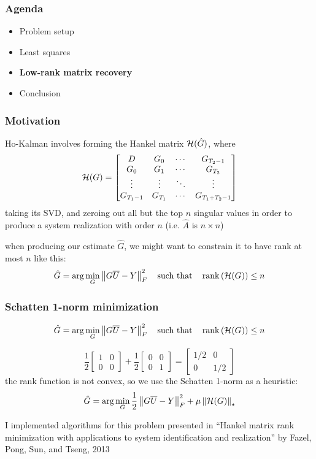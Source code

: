 \begin{frame}
\frametitle{Agenda}
\begin{itemize}
\item Problem setup
\item Least squares
\item \textbf{Low-rank matrix recovery}
\item Conclusion
\end{itemize}
\end{frame}

\begin{frame}
\frametitle{Motivation}
Ho-Kalman involves forming the Hankel matrix $\mathcal{H}(\hat G)$, where
\[
  \mathcal{H}(G) = \begin{bmatrix}
    D & G_0 & \cdots & G_{T_2-1} \\
    G_0 & G_1 & \cdots & G_{T_2} \\
    \vdots & \vdots & \ddots & \vdots \\
    G_{T_1-1} & G_{T_1} & \cdots & G_{T_1 + T_2 - 1}
  \end{bmatrix}
\]
taking its SVD, and zeroing out all but the top $n$ singular values
in order to produce a system realization with order $n$
(i.e. $\hat A$ is $n \times n$)

when producing our estimate $\hat G$,
we might want to constrain it to have rank at most $n$ like this:
\[
\hat G = \arg\min_G \left\Vert{G \overline{U} - Y}\right\Vert_F^2 \quad
\text{such that} \quad \operatorname{rank}\left({\mathcal{H}(G)}\right) \le n
\]
\end{frame}

\begin{frame}
\frametitle{Schatten 1-norm minimization}
\[
\hat G = \arg\min_G \left\Vert{G \overline{U} - Y}\right\Vert_F^2 \quad
\text{such that} \quad \operatorname{rank}\left({\mathcal{H}(G)}\right) \le n
\]

\[
\frac{1}{2} \begin{bmatrix} 1 & 0 \\ 0 & 0 \end{bmatrix}
+ \frac{1}{2} \begin{bmatrix} 0 & 0 \\ 0 & 1 \end{bmatrix}
= \begin{bmatrix} 1/2 & 0 \\ 0 & 1/2 \end{bmatrix}
\]
the rank function is not convex, so we use the Schatten 1-norm as a heuristic:
\[
\hat G = \arg\min_G \frac{1}{2} \left\Vert{G \overline{U} - Y}\right\Vert_F^2 + \mu \left\Vert{\mathcal{H}(G)}\right\Vert_\star
\]

I implemented algorithms for this problem presented in
``Hankel matrix rank minimization
with applications to system identification and realization''
by Fazel, Pong, Sun, and Tseng, 2013
\end{frame}

